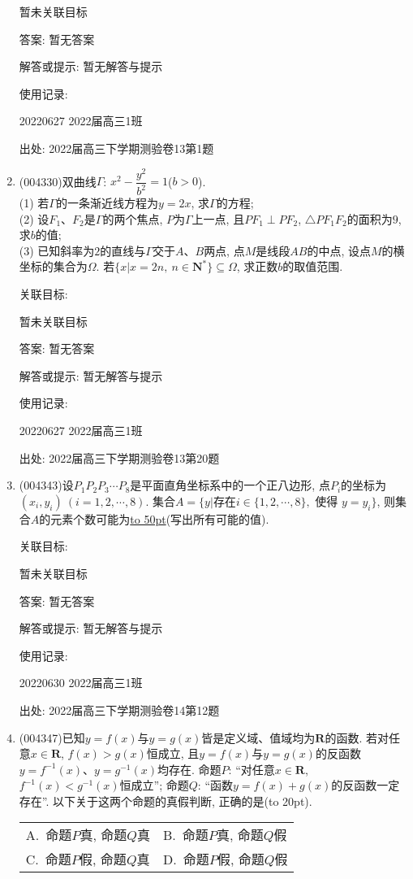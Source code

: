 \documentclass[10pt,a4paper]{article}
\newcommand{\blank}[1]{\underline{\hbox to #1pt{}}}
\newcommand{\bracket}[1]{(\hbox to #1pt{})}
\newcommand{\twoch}[4]{\par\begin{tabular}{p{.46\textwidth}p{.46\textwidth}}
A.~#1& B.~#2\\
C.~#3& D.~#4
\end{tabular}}
\begin{document}
\begin{enumerate}[1.]
暂未关联目标

答案: 暂无答案

解答或提示: 暂无解答与提示

使用记录:

20220627	2022届高三1班	


出处: 2022届高三下学期测验卷13第1题
\item { (004330)}双曲线$\Gamma$: $x^2-\dfrac{y^2}{b^2}=1$($b>0$).\\
(1) 若$\Gamma$的一条渐近线方程为$y=2x$, 求$\Gamma$的方程;\\
(2) 设$F_1$、$F_2$是$\Gamma$的两个焦点, $P$为$\Gamma$上一点, 且$PF_1\perp PF_2$, $\triangle PF_1F_2$的面积为$9$, 求$b$的值;\\
(3) 已知斜率为$2$的直线与$\Gamma$交于$A$、$B$两点, 点$M$是线段$AB$的中点, 设点$M$的横坐标的集合为$\Omega$. 若$\{x|x=2n,\ n\in \mathbf{N}^* \}\subseteq \Omega$, 求正数$b$的取值范围.


关联目标:

暂未关联目标

答案: 暂无答案

解答或提示: 暂无解答与提示

使用记录:

20220627	2022届高三1班			


出处: 2022届高三下学期测验卷13第20题
\item { (004343)}设$P_1P_2P_3\cdots P_8$是平面直角坐标系中的一个正八边形, 点$P_i$的坐标为$(x_i,y_i) \ (i=1,2,\cdots,8)$. 集合$A=\{y|\text{存在} i\in \{1,2,\cdots,8\},\text{ 使得 }y=y_i\}$, 则集合$A$的元素个数可能为\blank{50}(写出所有可能的值).


关联目标:

暂未关联目标

答案: 暂无答案

解答或提示: 暂无解答与提示

使用记录:

20220630	2022届高三1班	


出处: 2022届高三下学期测验卷14第12题
\item { (004347)}已知$y=f(x)$与$y=g(x)$皆是定义域、值域均为$\mathbf{R}$的函数. 若对任意$x\in \mathbf{R}$, $f(x)>g(x)$恒成立, 且$y=f(x)$与$y=g(x)$的反函数$y=f^{-1}(x)$、$y=g^{-1}(x)$均存在. 命题$P$: ``对任意$x\in \mathbf{R}$, $f^{-1}(x)<g^{-1}(x)$恒成立''; 命题$Q$: ``函数$y=f(x)+g(x)$的反函数一定存在''. 以下关于这两个命题的真假判断, 正确的是\bracket{20}.
\twoch{命题$P$真, 命题$Q$真}{命题$P$真, 命题$Q$假
}{命题$P$假, 命题$Q$真}{命题$P$假, 命题$Q$假}



\end{enumerate}
\end{document}
